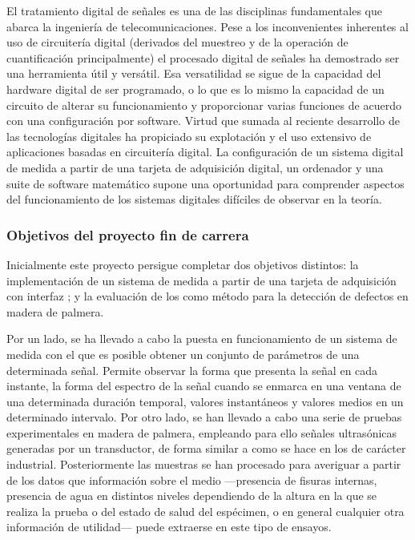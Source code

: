 El tratamiento digital de señales es una de las disciplinas fundamentales
que abarca la ingeniería de telecomunicaciones. Pese a los inconvenientes
inherentes al uso de circuitería digital (derivados del muestreo y de la
operación de cuantificación principalmente) el procesado digital de señales
ha demostrado ser una herramienta útil y versátil. Esa versatilidad se
sigue de la capacidad del hardware digital de ser programado, o lo que es
lo mismo la capacidad de un circuito de alterar su funcionamiento y
proporcionar varias funciones de acuerdo con una configuración por
software. Virtud que sumada al reciente desarrollo de las tecnologías
digitales ha propiciado su explotación y el uso extensivo de aplicaciones
basadas en circuitería digital. La configuración de un sistema digital de
medida a partir de una tarjeta de adquisición digital, un ordenador y una
suite de software matemático supone una oportunidad para comprender
aspectos del funcionamiento de los sistemas digitales difíciles de observar
en la teoría.


\subsubsection{Objetivos del proyecto fin de carrera}\label{sec:goals}

Inicialmente este proyecto persigue completar dos objetivos distintos: la
implementación de un sistema de medida a partir de una tarjeta de
adquisición con interfaz ; y la evaluación de los  como
método para la detección de defectos en madera de palmera.

Por un lado, se ha llevado a cabo la puesta en funcionamiento de un sistema
de medida con el que es posible obtener un conjunto de parámetros de una
determinada señal. Permite observar la forma que presenta la señal en cada
instante, la forma del espectro de la señal cuando se enmarca en una
ventana de una determinada duración temporal, valores instantáneos y
valores medios en un determinado intervalo. Por otro lado, se han llevado a
cabo una serie de pruebas experimentales en madera de palmera, empleando
para ello señales ultrasónicas generadas por un transductor, de forma
similar a como se hace en los  de carácter industrial.
Posteriormente las muestras se han procesado para averiguar a partir de los
datos que información sobre el medio ---presencia de fisuras internas,
presencia de agua en distintos niveles dependiendo de la altura en la que
se realiza la prueba o del estado de salud del espécimen, o en general
cualquier otra información de utilidad--- puede extraerse en este tipo de
ensayos.

